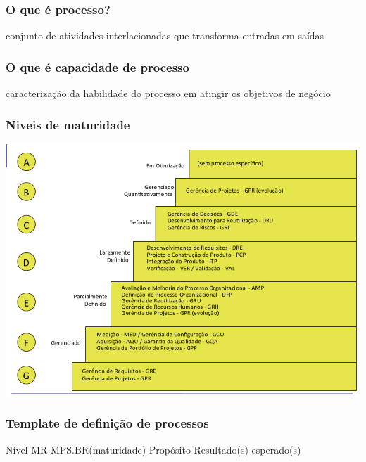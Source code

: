 \documentclass{article}
\begin{document}
\subsubsection{O que é processo?} conjunto de atividades interlacionadas que transforma entradas em saídas
	
\subsubsection{O que é capacidade de processo} caracterização da habilidade do processo em atingir os objetivos de negócio

\subsubsection{Niveis de maturidade}
\includegraphics[scale=0.50]{niveis_maturidade}

\subsubsection{Template de definição de processos}
Nível MR-MPS.BR(maturidade)
Propósito
Resultado(s) esperado(s) \\
\end{document}
